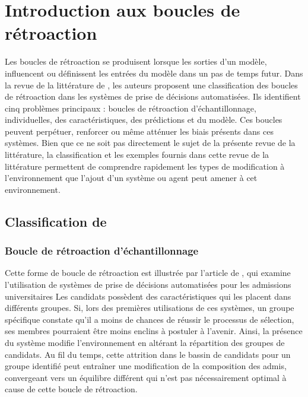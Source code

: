 \documentclass{article}
\theoremstyle{definition}
\begin{document}
\section{Introduction aux boucles de rétroaction}
Les boucles de rétroaction se produisent lorsque les sorties d'un modèle, influencent ou définissent les entrées du modèle dans un pas de temps futur. 
Dans la revue de la littérature de \citet{pagan_classification_2023}, les auteurs proposent une classification des boucles de rétroaction dans les systèmes de prise de décisions automatisées. Ils identifient cinq problèmes principaux : boucles de rétroaction d'échantillonnage, individuelles, des caractéristiques, des prédictions et du modèle. Ces boucles peuvent perpétuer, renforcer ou même atténuer les biais présents dans ces systèmes. Bien que ce ne soit pas directement le sujet de la présente revue de la littérature, la classification et les exemples fournis dans cette revue de la littérature permettent de comprendre rapidement les types de modification à l'environnement que l'ajout d'un système ou agent peut amener à cet environnement. 

\subsection{Classification de \citet{pagan_classification_2023}}

\subsubsection{Boucle de rétroaction d’échantillonnage}
Cette forme de boucle de rétroaction est illustrée par l'article de \citet{mozannar_fair_2020}, qui examine l’utilisation de systèmes de prise de décisions automatisées pour les admissions universitaires 
Les candidats possèdent des caractéristiques qui les placent dans différents groupes. Si, lors des premières utilisations de ces systèmes, un groupe spécifique constate qu'il a moins de chances de réussir le processus de sélection, ses membres pourraient être moins enclins à postuler à l'avenir. Ainsi, la présence du système modifie l'environnement en altérant la répartition des groupes de candidats. Au fil du temps, cette attrition dans le bassin de candidats pour un groupe identifié peut entraîner une modification de la composition des admis, convergeant vers un équilibre différent qui n'est pas nécessairement optimal à cause de cette boucle de rétroaction.
\end{document}
